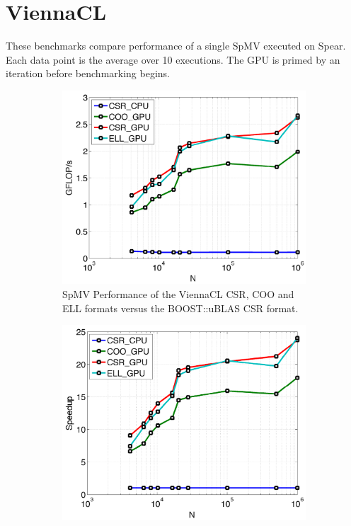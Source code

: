 \section{ViennaCL}

These benchmarks compare performance of a single SpMV executed on Spear. Each data point is the average over 10 executions. The GPU is primed by an iteration before benchmarking begins. 

\begin{figure}
\centering
\begin{subfigure}[t]{0.48\textwidth}
\centering
\includegraphics[width=1.0\textwidth]{../figures/spear_results/spmv/spmv_vcl_gflops-eps-converted-to.pdf}
\caption{SpMV Performance of the ViennaCL CSR, COO and ELL formats versus the BOOST::uBLAS CSR format.}
\label{fig:spear_vcl_gflops}
\end{subfigure} 
\begin{subfigure}[t]{0.48\textwidth}
\centering
\includegraphics[width=1.0\textwidth]{../figures/spear_results/spmv/spmv_vcl_speedup-eps-converted-to.pdf}

\end{subfigure}
\end{figure}
